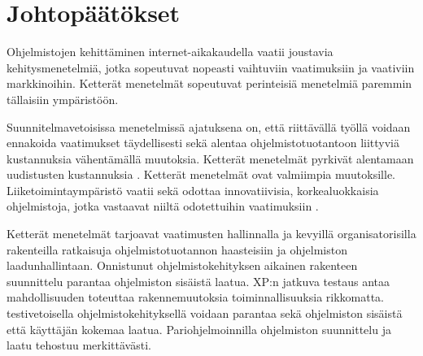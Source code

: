 \documentclass[finnish]{tktltiki2}
\theoremstyle{definition}
\theoremstyle{remark}
\begin{document}
\section{Johtopäätökset}

Ohjelmistojen kehittäminen internet-aikakaudella vaatii joustavia kehitysmenetelmiä, jotka sopeutuvat nopeasti vaihtuviin vaatimuksiin ja vaativiin markkinoihin. Ketterät menetelmät sopeutuvat perinteisiä menetelmiä paremmin tällaisiin ympäristöön.

Suunnitelmavetoisissa menetelmissä ajatuksena on, että riittävällä työllä voidaan ennakoida vaatimukset täydellisesti sekä alentaa ohjelmistotuotantoon liittyviä kustannuksia vähentämällä muutoksia. Ketterät menetelmät pyrkivät alentamaan uudistusten kustannuksia \cite{WIC03}. Ketterät menetelmät ovat valmiimpia muutoksille. Liiketoimintaympäristö vaatii sekä odottaa innovatiivisia, korkealuokkaisia ohjelmistoja, jotka vastaavat niiltä odotettuihin vaatimuksiin \cite{BRL03}.

Ketterät menetelmät tarjoavat vaatimusten hallinnalla ja kevyillä organisatorisilla rakenteilla ratkaisuja ohjelmistotuotannon haasteisiin ja ohjelmiston laadunhallintaan. Onnistunut ohjelmistokehityksen aikainen rakenteen suunnittelu parantaa ohjelmiston sisäistä laatua. XP:n jatkuva testaus antaa mahdollisuuden toteuttaa rakennemuutoksia toiminnallisuuksia rikkomatta. testivetoisella ohjelmistokehityksellä voidaan parantaa sekä ohjelmiston sisäistä että käyttäjän kokemaa laatua. Pariohjelmoinnilla ohjelmiston suunnittelu ja laatu tehostuu merkittävästi.


%
%
% 
%



\end{document}
